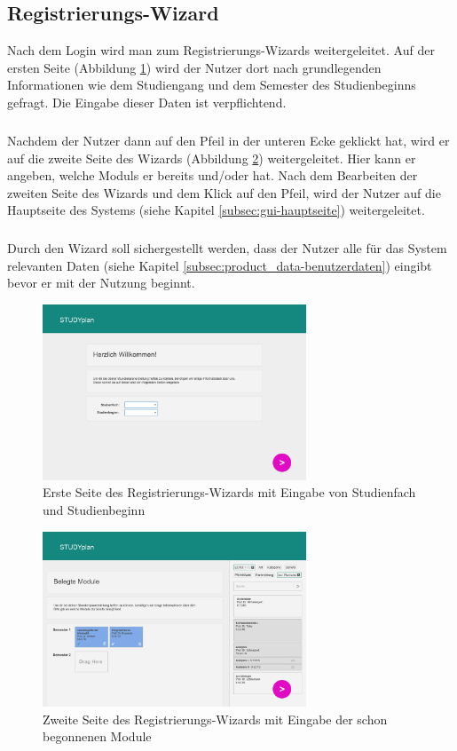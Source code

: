 \subsection{Registrierungs-Wizard}
\label{subsec:gui-registrierung}
Nach dem Login wird man zum Registrierungs-\gls{Wizard}s weitergeleitet. Auf der ersten Seite (Abbildung \ref{fig:gui-registrierung-1}) wird der Nutzer dort nach grundlegenden Informationen wie dem \gls{Studiengang} und dem \gls{Semester des Studienbeginns} gefragt. Die Eingabe dieser Daten ist verpflichtend.
\subparagraph{}
Nachdem der Nutzer dann auf den Pfeil in der unteren Ecke geklickt hat, wird er auf die zweite Seite des \gls{Wizard}s (Abbildung \ref{fig:gui-registrierung-2}) weitergeleitet. Hier kann er angeben, welche \glspl{Modul} er bereits  und/oder  hat. 
Nach dem Bearbeiten der zweiten Seite des \gls{Wizard}s und dem Klick auf den Pfeil, wird der Nutzer auf die Hauptseite des Systems (siehe Kapitel \ref{subsec:gui-hauptseite}) weitergeleitet.
\subparagraph{}
Durch den \gls{Wizard} soll sichergestellt werden, dass der Nutzer alle für das System relevanten Daten (siehe Kapitel \ref{subsec:product_data-benutzerdaten}) eingibt bevor er mit der Nutzung beginnt.
\begin{figure}[!htb]
	\caption{Erste Seite des Registrierungs-\gls{Wizard}s mit Eingabe von Studienfach und Studienbeginn}
	\label{fig:gui-registrierung-1}
	\centering
	\includegraphics[width=0.7\textwidth]{../GUI/ergebnisse/registrierung-1.png}
\end{figure}

\begin{figure}[!htb]
	\caption{Zweite Seite des Registrierungs-\gls{Wizard}s mit Eingabe der schon begonnenen Module}
	\label{fig:gui-registrierung-2}
	\centering
	\includegraphics[width=0.7\textwidth]{../GUI/ergebnisse/registrierung-2.png}
\end{figure}


